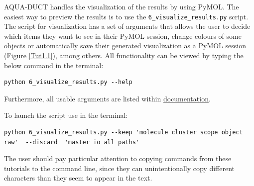 \documentclass[9pt,tutorial, pubversion]{livecoms}
\begin{document}
AQUA-DUCT handles the visualization of the results by using PyMOL. The easiest way to preview the results is to use the \texttt{6\_visualize\_results.py} script.
The script for visualization has a set of arguments that allows the user to decide which items they want to see in their PyMOL session, change colours of some objects or automatically save their generated visualization as a PyMOL session (Figure \ref{Tut1.1}), among others. All functionality can be viewed by typing the below command in the terminal:
\begin{lstlisting}
python 6_visualize_results.py --help
\end{lstlisting}
Furthermore, all usable arguments are listed within \href{https://tunneling-group.github.io/aqua-duct/valve/valve_manual.html?highlight=visualize\%20results#visualization}{documentation}.

To launch the script use in the terminal:
\begin{lstlisting}[columns=fullflexible]
python 6_visualize_results.py --keep 'molecule cluster scope object raw'  --discard  'master io all paths'
\end{lstlisting}
The user should pay particular attention to copying commands from these tutorials to the command line, since they can unintentionally copy different characters than they seem to appear in the text.
\end{document}
